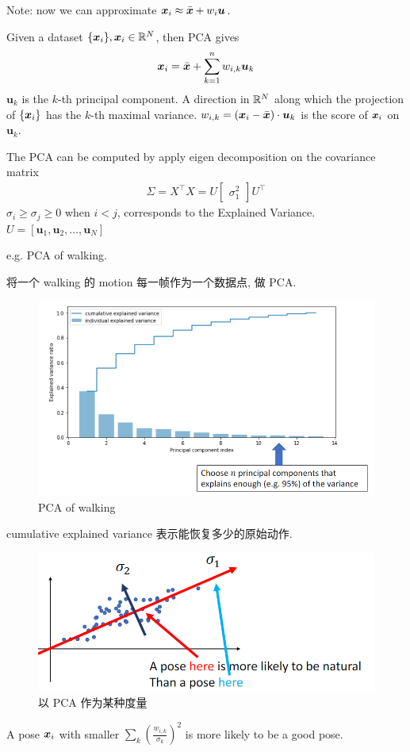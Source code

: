 Note: now we can approximate ${\bm{x}}_i\approx \bar{{\bm{x}}}+w_i\bm u$.

Given a dataset $\{ {\bm{x}}_i\}, {\bm{x}}_i\in\mathbb{R}^N$, then PCA gives
\begin{align*}
    {\bm{x}}_i=\bar{{\bm{x}}}+\sum_{k=1}^nw_{i,k}\bm{ u}_k
\end{align*}
$\bm{u}_k$ is the $k$-th principal component. A direction in $\mathbb{R}^N$ along which the projection of $\{ {\bm{x}}_i \}$ has the $k$-th maximal variance. $w_{i,k}=({\bm{x}}_i-\bar{{\bm{x}}})\cdot \bm{u}_k$ is the score of ${\bm{x}}_i$ on $\bm{u}_k$. 

The PCA can be computed by apply eigen decomposition on the covariance matrix
\begin{align*}
    \Sigma=X^\top X=U\begin{bmatrix}
        \sigma_1^2
    \end{bmatrix}U^\top
\end{align*}
$\sigma_i\ge \sigma_j\ge 0$ when $i<j$, corresponds to the Explained Variance. $U=[\bm{u}_1, \bm{u}_2,\dots,\bm{u}_N]$

e.g. PCA of walking. 

将一个 walking 的 motion 每一帧作为一个数据点, 做 PCA. 

\begin{figure}[!htb]
    \centering
    \includegraphics[width=0.618\linewidth]{pic/1056/PCA of walking}
    \caption{PCA of walking}
\end{figure}
cumulative explained variance 表示能恢复多少的原始动作. 

\begin{figure}[!htb]
    \centering
    \includegraphics[width=0.618\linewidth]{pic/1056/natural}
    \caption{以 PCA 作为某种度量}
\end{figure}
A pose ${\bm{x}}_i$ with smaller $\sum_k\left( \frac{w_{i,k}}{\sigma_k} \right)^2$ is more likely to be a good pose.




